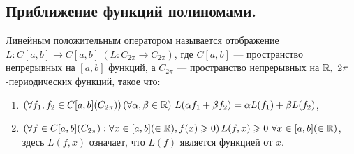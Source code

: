 \subsection{Приближение функций полиномами.}
\begin{Def}
	Линейным положительным оператором называется отображение ${L:C[a,b]\to C[a,b]}\ (L:C_{2\pi}\to C_{2\pi})$, где $C[a,b]$ --- пространство непрерывных на $[a,b]$ функций, а $C_{2\pi}$ --- пространство непрерывных на $\R,\ 2\pi$-периодических функций, такое что:
	\begin{enumerate}
		\item $\left(\forall f_1, f_2 \in C[a,b](C_{2\pi})\right)(\forall\alpha, \beta\in\mathbb{R})\  L(\alpha f_1+\beta f_2) = \alpha L(f_1)+\beta L(f_2)$,
		\item $\left(\forall f \in C[a,b](C_{2\pi}):\forall x\in[a,b](\in\mathbb{R}), f(x)\geqslant 0\right) L(f,x)\geqslant0\ \forall x\in[a,b](\in\mathbb{R})$, здесь $L(f,x)$ означает, что $L(f)$ является функцией от $x$.
	\end{enumerate}
\end{Def}

